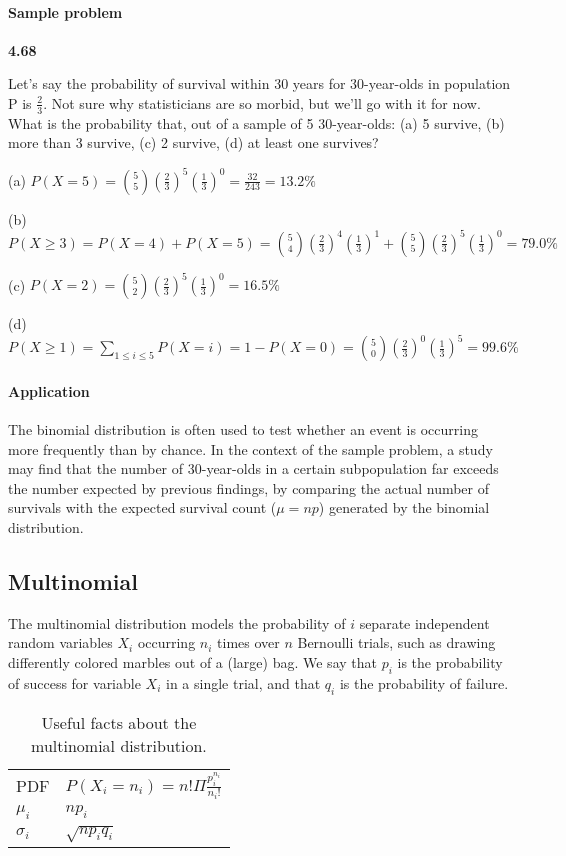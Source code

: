 \documentclass[11pt,letterpaper]{scrartcl}
\begin{document}
\paragraph{Sample problem}

\textbf{4.68}

Let's say the probability of survival within 30 years for 30-year-olds in population P is $\frac{2}{3}$.
Not sure why statisticians are so morbid, but we'll go with it for now.
What is the probability that, out of a sample of 5 30-year-olds: (a) 5 survive, (b) more than 3 survive, (c) 2 survive, (d) at least one survives?

(a) $P(X=5) = \binom{5}{5}(\frac{2}{3})^{5}(\frac{1}{3})^{0} = \frac{32}{243} = 13.2\%$

(b) $P(X \geq 3) = P(X=4) + P(X=5) = \binom{5}{4}(\frac{2}{3})^{4}(\frac{1}{3})^{1} + \binom{5}{5}(\frac{2}{3})^{5}(\frac{1}{3})^{0} = 79.0\%$

(c) $P(X=2) = \binom{5}{2}(\frac{2}{3})^{5}(\frac{1}{3})^{0} = 16.5\%$

(d) $P(X \geq 1) = \sum_{1 \leq i \leq 5} P(X = i) = 1 - P(X=0) = \binom{5}{0}(\frac{2}{3})^{0}(\frac{1}{3})^{5} = 99.6\%$

\paragraph{Application}

The binomial distribution is often used to test whether an event is occurring more frequently than by chance.
In the context of the sample problem, a study may find that the number of 30-year-olds in a certain subpopulation far exceeds the number expected by previous findings, by comparing the actual number of survivals with the expected survival count ($\mu=np$) generated by the binomial distribution.

\subsection{Multinomial}

The multinomial distribution models the probability of $i$ separate independent random variables $X_{i}$ occurring $n_{i}$ times over $n$ Bernoulli trials, such as drawing differently colored marbles out of a (large) bag.
We say that $p_{i}$ is the probability of success for variable $X_{i}$ in a single trial, and that $q_{i}$ is the probability of failure.

\begin{table}[h!]
\centering
\begin{tabular}{l l} \hline
PDF & $P(X_{i}=n_{i})=n! \Pi \frac{p_{i}^{n_{i}}}{n_{i}!}$ \\
$\mu_{i} $ & $np_{i}$ \\
$\sigma_{i} $ & $\sqrt{np_{i}q_{i}}$ \\ \hline
\end{tabular}
\caption{Useful facts about the multinomial distribution.}
\label{tab:multinomial}
\end{table}
\end{document}
